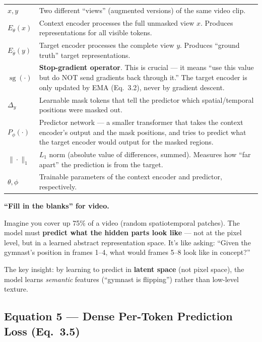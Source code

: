 \documentclass[12pt, a4paper]{article}
\begin{document}
\begin{explainbox}
\begin{tabular}{lp{11cm}}
$x, y$ & Two different ``views'' (augmented versions) of the same video clip.\\[0.2cm]
$E_\theta(x)$ & Context encoder processes the full unmasked view $x$. Produces representations for all visible tokens.\\[0.2cm]
$E_{\bar{\theta}}(y)$ & Target encoder processes the complete view $y$. Produces ``ground truth'' target representations.\\[0.2cm]
$\operatorname{sg}(\cdot)$ & \textbf{Stop-gradient operator}. This is crucial --- it means ``use this value but do NOT send gradients back through it.'' The target encoder is only updated by EMA (Eq.~3.2), never by gradient descent.\\[0.2cm]
$\Delta_y$ & Learnable mask tokens that tell the predictor which spatial/temporal positions were masked out.\\[0.2cm]
$P_\phi(\cdot)$ & Predictor network --- a smaller transformer that takes the context encoder's output and the mask positions, and tries to predict what the target encoder would output for the masked regions.\\[0.2cm]
$\|\cdot\|_1$ & $L_1$ norm (absolute value of differences, summed). Measures how ``far apart'' the prediction is from the target.\\[0.2cm]
$\theta, \phi$ & Trainable parameters of the context encoder and predictor, respectively.
\end{tabular}
\end{explainbox}

\begin{analogybox}
\textbf{``Fill in the blanks'' for video.}

Imagine you cover up 75\% of a video (random spatiotemporal patches). The model must \textbf{predict what the hidden parts look like} --- not at the pixel level, but in a learned abstract representation space. It's like asking: ``Given the gymnast's position in frames 1--4, what would frames 5--8 look like in concept?''

The key insight: by learning to predict in \textbf{latent space} (not pixel space), the model learns \textit{semantic} features (``gymnast is flipping'') rather than low-level texture.
\end{analogybox}


\subsection{Equation 5 --- Dense Per-Token Prediction Loss (Eq.~3.5)}
\end{document}
